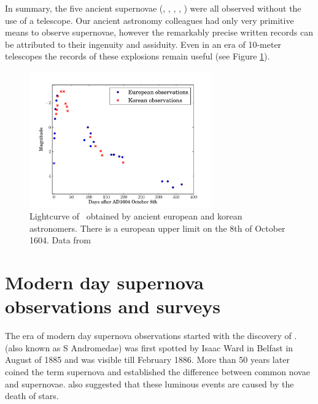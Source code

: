 In summary, the five ancient supernovae (, , , , ) were all observed without the use of a telescope. Our ancient astronomy colleagues had only very primitive means to observe supernovae, however the remarkably precise written records can be attributed to their ingenuity and assiduity. Even in an era of 10-meter telescopes the records of these explosions remain useful (see Figure \ref{fig:sn1604_ancient_lc}).


\begin{figure}[htbp] %
   \centering
   \includegraphics[width=0.7\textwidth]{chapter_intro/plots/sn1604_ancient_lc.pdf} 
   \caption{Lightcurve of \ obtained by ancient european and korean astronomers. There is a european upper limit on the 8th of October 1604. Data from \citet{1977QB841.C58......, 2003LNP...598....7G}}
   \label{fig:sn1604_ancient_lc}
\end{figure}

\section{Modern day supernova observations and surveys}
\label{sec:surveys}

The era of modern day supernova observations started with the discovery of .  (also known as S Andromedae) was first spotted by Isaac Ward in Belfast in August of 1885 \citep{1885AN....112..360H} and was visible till February 1886. 
More than 50 years later \citet{1934PNAS...20..254B} coined the term supernova and established the difference between common novae and supernovae. \citet{1934PNAS...20..254B} also suggested that these luminous events are caused by the death of stars. 

